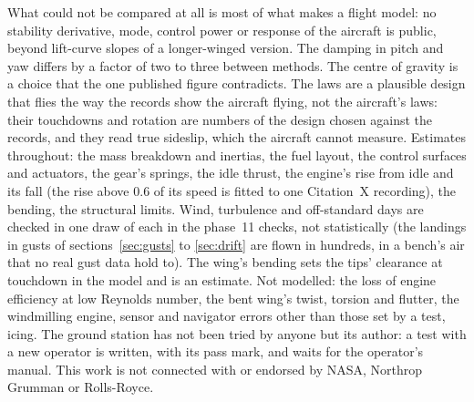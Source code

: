 \documentclass[10pt,a4paper,twocolumn]{article}
\begin{document}
What could not be compared at all is most of what makes a flight model: no stability derivative, mode, control power or response of the aircraft is
public, beyond lift-curve slopes of a longer-winged version. The damping in pitch and yaw differs by a factor of two to three between methods. The
centre of gravity is a choice that the one published figure contradicts. The laws are a plausible design that flies the way the records show the
aircraft flying, not the aircraft's laws: their touchdowns and rotation are numbers of the design chosen against the records, and they read true sideslip,
which the aircraft cannot measure. Estimates throughout: the mass breakdown and inertias, the fuel layout, the control surfaces and actuators, the
gear's springs, the idle thrust, the engine's rise from idle and its fall (the rise above 0.6 of its speed is fitted to one Citation~X recording), the bending, the
structural limits. Wind, turbulence and off-standard days are checked in one draw of each in the phase~11 checks, not statistically (the landings in gusts of sections~\ref{sec:gusts} to \ref{sec:drift} are flown in hundreds, in a bench's air that no real gust data
hold to). The wing's bending sets the tips' clearance at touchdown in the model and is an estimate. Not modelled: the loss of engine efficiency at low Reynolds number, the bent wing's twist, torsion and flutter, the windmilling engine, sensor and navigator
errors other than those set by a test, icing. The ground station has not been tried by anyone but its author: a test with a new operator is written,
with its pass mark, and waits for the operator's manual. This work is not connected with or endorsed by NASA, Northrop Grumman or Rolls-Royce.
\end{document}
